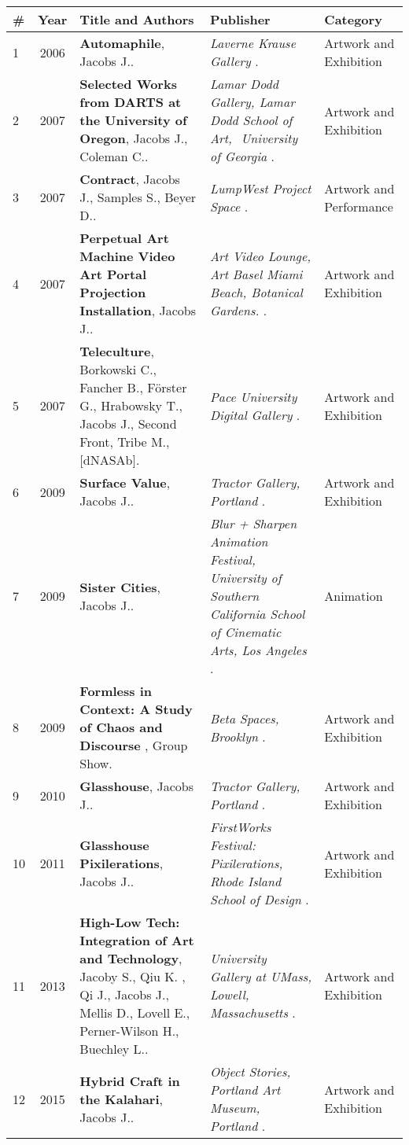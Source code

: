
\begin{longtable}{lcp{7.50cm}>{\raggedright}p{5.25cm}p{2cm}}
\# & Year & Title and Authors & Publisher & Category\\
\hline 
\endhead 
    1 & 2006 & {\bf Automaphile}, Jacobs J.. & \emph{ Laverne Krause Gallery }.  & Artwork and Exhibition\\
    2 & 2007 & {\bf Selected Works from DARTS at the University of Oregon}, Jacobs J., Coleman C.. & \emph{ Lamar Dodd Gallery, Lamar Dodd School of Art,  University of Georgia }.  & Artwork and Exhibition\\
    3 & 2007 & {\bf Contract}, Jacobs J., Samples S., Beyer D.. & \emph{ LumpWest Project Space }.  & Artwork and Performance\\
    4 & 2007 & {\bf Perpetual Art Machine Video Art Portal Projection Installation}, Jacobs J.. & \emph{ Art Video Lounge, Art Basel Miami Beach, Botanical Gardens. }.  & Artwork and Exhibition\\
    5 & 2007 & {\bf Teleculture}, Borkowski C., Fancher B., Förster G., Hrabowsky T., Jacobs J., Second Front, Tribe M., [dNASAb]. & \emph{ Pace University Digital Gallery }.  & Artwork and Exhibition\\
    6 & 2009 & {\bf Surface Value}, Jacobs J.. & \emph{ Tractor Gallery, Portland }.  & Artwork and Exhibition\\
    7 & 2009 & {\bf Sister Cities}, Jacobs J.. & \emph{ Blur + Sharpen Animation Festival, University of Southern California School of Cinematic Arts, Los Angeles  }.  & Animation\\
    8 & 2009 & {\bf Formless in Context: A Study of Chaos and Discourse }, Group Show. & \emph{ Beta Spaces, Brooklyn }.  & Artwork and Exhibition\\
    9 & 2010 & {\bf Glasshouse}, Jacobs J.. & \emph{ Tractor Gallery, Portland }.  & Artwork and Exhibition\\
    10 & 2011 & {\bf Glasshouse Pixilerations}, Jacobs J.. & \emph{ FirstWorks Festival: Pixilerations, Rhode Island School of Design }.  & Artwork and Exhibition\\
    11 & 2013 & {\bf High-Low Tech: Integration of Art and Technology}, Jacoby S., Qiu K. , Qi J., Jacobs J., Mellis D., Lovell E., Perner-Wilson H., Buechley L.. & \emph{ University Gallery at UMass, Lowell, Massachusetts }.  & Artwork and Exhibition\\
    12 & 2015 & {\bf Hybrid Craft in the Kalahari}, Jacobs J.. & \emph{ Object Stories, Portland Art Museum, Portland }.  & Artwork and Exhibition\\

\end{longtable}
